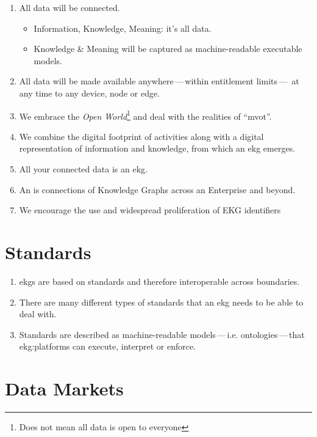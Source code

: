 \begin{enumerate}
    \item All data will be connected.
          \begin{itemize}
              \item Information, Knowledge, Meaning: it's all data.
              \item Knowledge \& Meaning will be captured as machine-readable executable models.
          \end{itemize}
    \item All data will be made available anywhere\,---\,within entitlement limits\,---\,%
          at any time to any device, node or edge.
    \item We embrace the \textit{Open World}\footnote{Does not mean all data is open to everyone} and deal with the realities of \enquote{\gls{mvot}}.
    \item We combine the digital footprint of activities along with a digital representation of
          information and knowledge, from which an \gls{ekg} emerges.
    \item All your connected data is an \gls{ekg}.
    \item An  is connections of Knowledge Graphs across an Enterprise and beyond.
    \item We encourage the use and widespread proliferation of EKG identifiers
\end{enumerate}

\section{Standards}

\begin{enumerate}
    \item \Glspl{ekg} are based on standards and therefore interoperable across boundaries.
    \item There are many different types of standards that an \gls{ekg} needs to be able to deal with.
    \item Standards are described as machine-readable models\,---\,i.e. ontologies\,---\,that \glspl{ekg:platform}
          can execute, interpret or enforce.
\end{enumerate}

\section{Data Markets}

